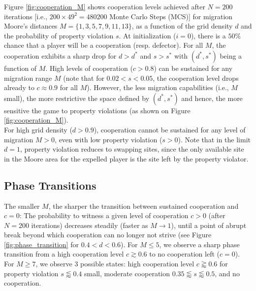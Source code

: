 Figure \ref{fig:cooperation_M} shows cooperation levels achieved after $N=200$ iterations [i.e., $200 \times 49^2 = 480200$ Monte Carlo Steps (MCS)] for migration Moore's distances $M = \{1,3,5,7,9,11,13 \}$, as a function of the grid density $d$ and the probability of property violation $s$. At initialization ($i=0$), there is a $50\%$ chance that a player will be a cooperation (resp. defector). For all $M$, the cooperation exhibits a sharp drop for $d>d^*$  and $s > s^*$ with $(d^*,s^*)$ being a function of $M$. High levels of cooperation ($c > 0.8$) can be sustained for any migration range $M$ (note that for $0.02 < s < 0.05$, the cooperation level drops already to $c \approx 0.9$ for all $M$). However, the less migration capabilities (i.e., $M$ small), the more restrictive the space defined by $(d^*,s^*)$ and hence, the more sensitive the game to property violations (as shown on Figure  \ref{fig:cooperation_M}).\\

For high grid density ($d>0.9$), cooperation cannot be sustained for any level of migration $M>0$, even with low property violation ($s > 0$). Note that in the limit $d=1$, property violation reduces to swapping sites, since the only available site in the Moore area for the expelled player is the site left by the property violator.\\

\subsection*{Phase Transitions}
The smaller $M$, the sharper the transition between sustained cooperation and $c=0$: The probability to witness a given level of cooperation $c > 0$ (after $N=200$ iterations) decreases steadily (faster as $M \rightarrow 1$), until a point of abrupt break beyond which cooperation can no longer not strive (see Figure \ref{fig:phase_transition} for $0.4 < d < 0.6$). For $M \leqslant 5$, we observe a sharp phase transition from a high cooperation level $c \gtrsim 0.6$ to no cooperation left ($c=0$). For $M \geqslant 7$, we observe 3 possible states: high cooperation level $c \gtrapprox 0.6$ for property violation $s \lessapprox 0.4$ small, moderate cooperation $ 0.35 \lessapprox s  \lessapprox 0.5 $, and no cooperation.\\
 
